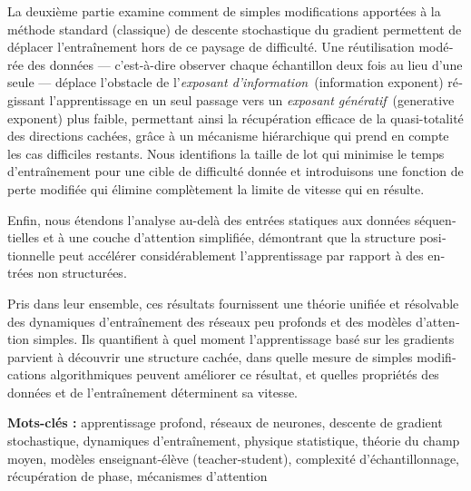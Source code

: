 \begin{otherlanguage}{french}
\begin{noparskip}
La deuxième partie examine comment de simples modifications apportées à la méthode standard (classique) de descente stochastique du gradient permettent de déplacer l’entraînement hors de ce paysage de difficulté. Une réutilisation modérée des données — c’est-à-dire observer chaque échantillon deux fois au lieu d’une seule — déplace l’obstacle de l’\emph{exposant d’information}~(information exponent) régissant l’apprentissage en un seul passage vers un \emph{exposant génératif}~(generative exponent) plus faible, permettant ainsi la récupération efficace de la quasi-totalité des directions cachées, grâce à un mécanisme hiérarchique qui prend en compte les cas difficiles restants. Nous identifions la taille de lot qui minimise le temps d’entraînement pour une cible de difficulté donnée et introduisons une fonction de perte modifiée qui élimine complètement la limite de vitesse qui en résulte.

Enfin, nous étendons l’analyse au-delà des entrées statiques aux données séquentielles et à une couche d’attention simplifiée, démontrant que la structure positionnelle peut accélérer considérablement l’apprentissage par rapport à des entrées non structurées.

Pris dans leur ensemble, ces résultats fournissent une théorie unifiée et résolvable des dynamiques d’entraînement des réseaux peu profonds et des modèles d’attention simples. Ils quantifient à quel moment l’apprentissage basé sur les gradients parvient à découvrir une structure cachée, dans quelle mesure de simples modifications algorithmiques peuvent améliorer ce résultat, et quelles propriétés des données et de l’entraînement déterminent sa vitesse.

\end{noparskip}
\textbf{Mots-clés :} apprentissage profond, réseaux de neurones, descente de gradient stochastique, dynamiques d’entraînement, physique statistique, théorie du champ moyen, modèles enseignant-élève (teacher-student), complexité d’échantillonnage, récupération de phase, mécanismes d’attention
\end{otherlanguage}
